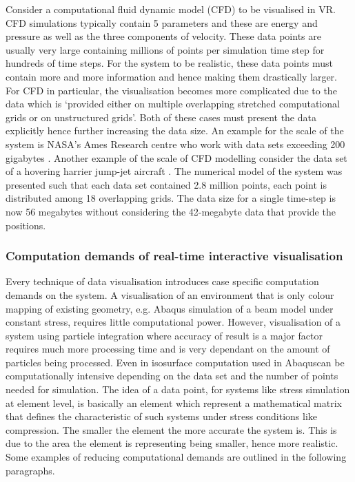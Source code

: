 Consider a computational fluid dynamic model (CFD) to be visualised in VR. CFD simulations typically contain 5 parameters and these are energy and pressure as well as the three components of velocity. These data points are usually very large containing millions of points per simulation time step for hundreds of time steps. For the system to be realistic, these data points must contain more and more information and hence making them drastically larger.  For CFD in particular, the visualisation becomes more complicated due to the data which is `provided either on multiple overlapping stretched computational grids or on unstructured grids'\cite{bryson1996virtual}. Both of these cases must present the data explicitly hence further increasing the data size. An example for the scale of the system is NASA's Ames Research centre who work with data sets exceeding 200 gigabytes \cite{bryson1996virtual}. Another example of the scale of CFD modelling consider the data set of a hovering harrier jump-jet aircraft \cite{smith1991numerical}. The numerical model of the system was presented such that each data set contained 2.8 million points, each point is distributed among 18 overlapping grids. The data size for a single time-step is now 56 megabytes without considering the 42-megabyte data that provide the positions.

\subsubsection{Computation demands of real-time interactive visualisation}
Every technique of data visualisation introduces case specific computation demands on the system. A visualisation of an environment that is only colour mapping of existing geometry, e.g. Abaqus\textregistered{} simulation of a beam model under constant stress, requires little computational power. However, visualisation of a system using particle integration where accuracy of result is a major factor requires much more processing time and is very dependant on the amount of particles being processed. Even in isosurface computation used in Abaqus\textregistered\space can be computationally intensive depending on the data set and the number of points needed for simulation. The idea of a  data point, for systems like stress simulation at element level,  is basically an element which represent a mathematical matrix that defines the characteristic of such systems under stress conditions like compression. The smaller the element the more accurate the system is. This is due to the area the element is representing being smaller, hence more realistic. Some examples of reducing computational demands are outlined in the following paragraphs.


